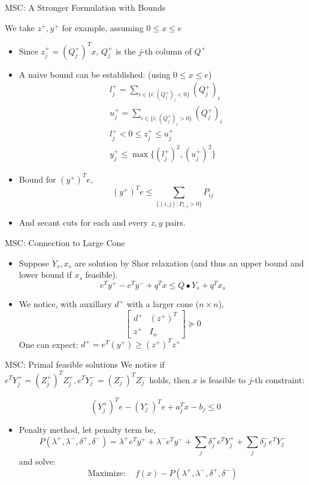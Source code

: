 \begin{frame}{MSC: A Stronger Formulation with Bounds}

  We take \(z^+, y^+\) for example, assuming \(0\le x\le e\)
  \begin{itemize}
    \item Since \(z^+_j = (Q^+_j)^T x\), \(Q^+_j\) is the \(j\)-th column of \(Q^+\)
    \item A naive bound can be established: (using \(0 \le x \le e\))
          \[\begin{aligned}
               & l^+_j = \sum_{i\in\{i: (Q^+_j)_i < 0\}} (Q^+_j)_i \\
               & u^+_j = \sum_{i\in\{i: (Q^+_j)_i > 0\}} (Q^+_j)_i \\
               & l^+_j < 0 \le z^+_j \le  u^+_j                    \\
               & y^+_j \le \max \{(l^+_j)^2, (u^+_j)^2\}
            \end{aligned}
          \]
    \item Bound for \((y^+)^T e\),
          \[(y^+)^T e \le \sum_{\{(i,j): P_{i,j} > 0 \}} P_{ij} \]
    \item And secant cuts for each and every \(z, y\) pairs.
  \end{itemize}

\end{frame}

\begin{frame}{MSC: Connection to Large Cone}
  \begin{itemize}
    \item Suppose \(Y_s, x_s\) are solution by Shor relaxation (and thus an upper bound and lower bound if \(x_s\) feasible).
          \[e^Ty^+ - e^Ty^- +  q^Tx \le Q\bullet Y_s  + q^T x_s\]
    \item We notice, with auxillary \(d^+\) with a larger cone (\(n \times n\)),
          \[\begin{bmatrix}d^+ & (z^+)^T\\ z^+ & I_n \end{bmatrix} \succeq 0\]
          One can expect: \(d^+ = e^T(y^+)\ge (z^+)^Tz^+\)
  \end{itemize}

\end{frame}

\begin{frame}{MSC: Primal feasible solutions}
  We notice if \(e^TY^+_j = (Z^+_j)^TZ^+_j,  e^TY^-_j = (Z^-_j)^TZ^-_j\) holds,
  then \(x\) is feasible to \(j\)-th constraint:

  \[(Y^+_j)^Te - (Y^-_j)^Te + a_j^Tx - b_j \le 0\]

  \begin{itemize}
    \item Penalty method, let penalty term be,
          \[P(\lambda^+, \lambda^-, \delta^+, \delta^-)
            = \lambda^+ e^Ty^+ + \lambda^-e^Ty^-
            + \sum_j \delta^+_j e^TY^+_j + \sum_j \delta^-_j e^TY^-_j\]
          and solve:
          \[\mathrm{Maximize: } \quad f(x) - P(\lambda^+, \lambda^-, \delta^+, \delta^-) \]
  \end{itemize}
\end{frame}

